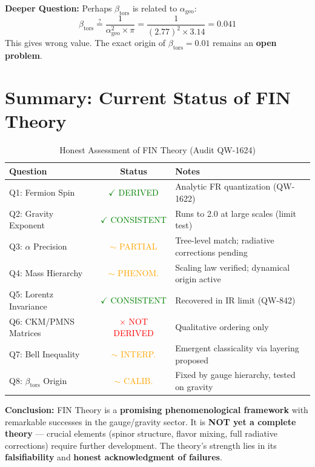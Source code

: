 \documentclass[11pt,a4paper]{book}
\theoremstyle{remark}
\newcommand{\alphageo}{\alpha_{\text{geo}}}
\newcommand{\betators}{\beta_{\text{tors}}}
\begin{document}
\textbf{Deeper Question:}
Perhaps $\betators$ is related to $\alphageo$:
\begin{equation}
\betators \stackrel{?}{=} \frac{1}{\alphageo^2 \times \pi} = \frac{1}{(2.77)^2 \times 3.14} = 0.041
\end{equation}
This gives wrong value. The exact origin of $\betators = 0.01$ remains an \textbf{open problem}.

\section{Summary: Current Status of FIN Theory}

\begin{table}[H]
\centering
\caption{Honest Assessment of FIN Theory (Audit QW-1624)}
\begin{tabular}{|l|c|l|}
\hline
\textbf{Question} & \textbf{Status} & \textbf{Notes} \\
\hline
Q1: Fermion Spin & \textcolor{green}{$\checkmark$ DERIVED} & Analytic FR quantization (QW-1622) \\
Q2: Gravity Exponent & \textcolor{green}{$\checkmark$ CONSISTENT} & Runs to 2.0 at large scales (limit test) \\
Q3: $\alpha$ Precision & \textcolor{orange}{$\sim$ PARTIAL} & Tree-level match; radiative corrections pending \\
Q4: Mass Hierarchy & \textcolor{orange}{$\sim$ PHENOM.} & Scaling law verified; dynamical origin active \\
Q5: Lorentz Invariance & \textcolor{green}{$\checkmark$ CONSISTENT} & Recovered in IR limit (QW-842) \\
Q6: CKM/PMNS Matrices & \textcolor{red}{$\times$ NOT DERIVED} & Qualitative ordering only \\
Q7: Bell Inequality & \textcolor{orange}{$\sim$ INTERP.} & Emergent classicality via layering proposed \\
Q8: $\betators$ Origin & \textcolor{orange}{$\sim$ CALIB.} & Fixed by gauge hierarchy, tested on gravity \\
\hline
\end{tabular}
\end{table}

\textbf{Conclusion:}
FIN Theory is a \textbf{promising phenomenological framework} with remarkable successes in the gauge/gravity sector. It is \textbf{NOT yet a complete theory} --- crucial elements (spinor structure, flavor mixing, full radiative corrections) require further development. The theory's strength lies in its \textbf{falsifiability} and \textbf{honest acknowledgment of failures}.
\end{document}
